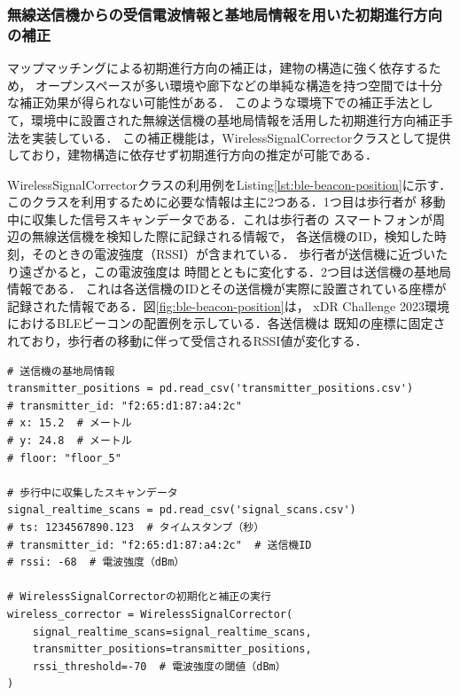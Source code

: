 
\subsubsection{無線送信機からの受信電波情報と基地局情報を用いた初期進行方向の補正}

マップマッチングによる初期進行方向の補正は，建物の構造に強く依存するため，
オープンスペースが多い環境や廊下などの単純な構造を持つ空間では十分な補正効果が得られない可能性がある．
このような環境下での補正手法として，環境中に設置された無線送信機の基地局情報を活用した初期進行方向補正手法を実装している．
この補正機能は，WirelessSignalCorrectorクラスとして提供しており，建物構造に依存せず初期進行方向の推定が可能である．

WirelessSignalCorrectorクラスの利用例をListing\ref{lst:ble-beacon-position}に示す．
このクラスを利用するために必要な情報は主に2つある．1つ目は歩行者が
移動中に収集した信号スキャンデータである．これは歩行者の
スマートフォンが周辺の無線送信機を検知した際に記録される情報で，
各送信機のID，検知した時刻，そのときの電波強度（RSSI）が含まれている．
歩行者が送信機に近づいたり遠ざかると，この電波強度は
時間とともに変化する．2つ目は送信機の基地局情報である．
これは各送信機のIDとその送信機が実際に設置されている座標が
記録された情報である．図\ref{fig:ble-beacon-position}は，
xDR Challenge 2023環境におけるBLEビーコンの配置例を示している．各送信機は
既知の座標に固定されており，歩行者の移動に伴って受信されるRSSI値が変化する．

\begin{lstlisting}[caption={WirelessSignalCorrectorの使用例},label=lst:ble-beacon-position,float=h]
# 送信機の基地局情報
transmitter_positions = pd.read_csv('transmitter_positions.csv')
# transmitter_id: "f2:65:d1:87:a4:2c"
# x: 15.2  # メートル
# y: 24.8  # メートル
# floor: "floor_5"

# 歩行中に収集したスキャンデータ
signal_realtime_scans = pd.read_csv('signal_scans.csv')
# ts: 1234567890.123  # タイムスタンプ（秒）
# transmitter_id: "f2:65:d1:87:a4:2c"  # 送信機ID
# rssi: -68  # 電波強度（dBm）

# WirelessSignalCorrectorの初期化と補正の実行
wireless_corrector = WirelessSignalCorrector(
    signal_realtime_scans=signal_realtime_scans,
    transmitter_positions=transmitter_positions,
    rssi_threshold=-70  # 電波強度の閾値（dBm）
)
\end{lstlisting}

